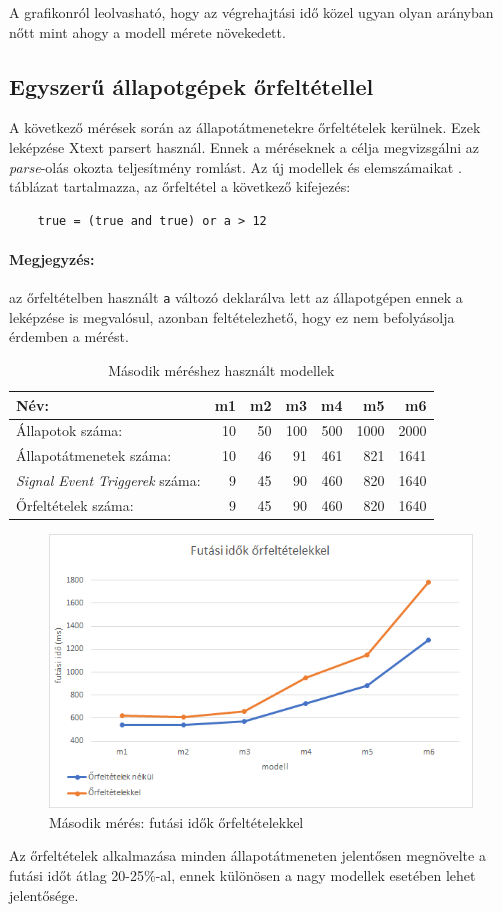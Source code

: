 A grafikonról leolvasható, hogy az végrehajtási idő közel ugyan olyan arányban nőtt mint ahogy a modell mérete növekedett.

\subsection{Egyszerű állapotgépek őrfeltétellel}

A következő mérések során az állapotátmenetekre őrfeltételek kerülnek. Ezek leképzése Xtext parsert használ. Ennek a méréseknek a célja megvizsgálni az \emph{parse}-olás okozta teljesítmény romlást. Az új modellek és elemszámaikat . táblázat tartalmazza, az őrfeltétel a következő kifejezés:
\begin{lstlisting}
	true = (true and true) or a > 12
\end{lstlisting}

\paragraph{Megjegyzés:} az őrfeltételben használt \verb+a+ változó deklarálva lett az állapotgépen ennek a leképzése is megvalósul, azonban feltételezhető, hogy ez nem befolyásolja érdemben a mérést.

\begin{table}[H]
	\footnotesize
	\centering
	\begin{tabular}{ l r r r r r r}
		Név: & m1 & m2 & m3 & m4 & m5 & m6 \\ \hline
		Állapotok száma:  & 10 & 50 & 100 & 500 & 1000 & 2000 \\
		Állapotátmenetek száma: & 10 & 46 & 91 & 461 & 821 & 1641 \\
		\emph{Signal Event Triggerek} száma: & 9 & 45 & 90 & 460 & 820 & 1640 \\
		Őrfeltételek száma: & 9 & 45 & 90 & 460 & 820 & 1640
	\end{tabular}
	\caption{Második méréshez használt modellek}
	\label{table:meres2}
\end{table}

\begin{figure}[H]
	\centering
	\includegraphics[keepaspectratio, width=140mm]{figures/meres2.png}
	\caption{Második mérés: futási idők őrfeltételekkel}
	\label{fig:meres2}
\end{figure}

Az őrfeltételek alkalmazása minden állapotátmeneten jelentősen megnövelte a futási időt átlag 20-25\%-al, ennek különösen a nagy modellek esetében lehet jelentősége.






